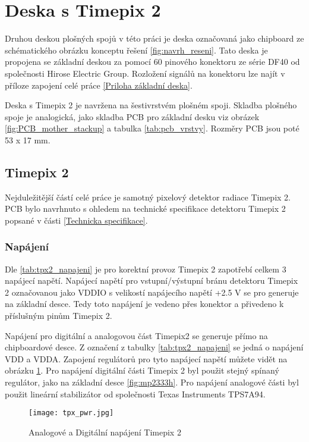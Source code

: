 \section{Deska s Timepix 2}
	Druhou deskou plošných spojů v této práci je deska označovaná jako chipboard ze schématického obrázku konceptu řešení \ref{fig:navrh_reseni}. Tato deska je propojena se základní deskou za pomocí 60 pinového konektoru ze série DF40 od společnosti Hirose Electric Group. Rozložení signálů na konektoru lze najít v příloze zapojení celé práce \ref{Priloha základní deska}.
	
	\par Deska s Timepix 2 je navržena na šestivrstvém plošném spoji. Skladba plošného spoje je analogická, jako skladba PCB pro základní desku viz obrázek \ref{fig:PCB_mother_stackup} a tabulka \ref{tab:pcb_vrstvy}. Rozměry PCB jsou poté 53 x 17 mm. 
\subsection{Timepix 2}	%
	Nejduležitější částí celé práce je samotný pixelový detektor radiace Timepix 2. PCB bylo navrhnuto s ohledem na technické specifikace detektoru Timepix 2 popsané v části \ref{Technicka specifikace}.
	\subsubsection{Napájení}	%
	Dle \ref{tab:tpx2_napajeni} je pro korektní provoz Timepix 2 zapotřebí celkem 3 napájecí napětí. Napájecí napětí pro vstupní/výstupní bránu detektoru Timepix 2 označovanou jako VDDIO s velikostí napájecího napětí +2.5 V se pro generuje na základní desce. Tedy toto napájení je vedeno přes konektor a přivedeno k příslušným pinům Timepix 2.
	\par Napájení pro digitální a analogovou část Timepix2 se generuje přímo na chipboardové desce. Z označení z tabulky \ref{tab:tpx2_napajeni} se jedná o napájení VDD a VDDA. Zapojení regulátorů pro tyto napájecí napětí můžete vidět na obrázku \ref{fig:tpx_pwr}. Pro napájení digitální části Timepix 2 byl použit stejný spínaný regulátor, jako na základní desce \ref{fig:mp2333h}. Pro napájení analogové části byl použit lineární stabilizátor od společnosti Texas Instruments TPS7A94.  
	
	\begin{figure}[h!]
		\centering
		\captionsetup{justification=centering}
		\texttt{[image: tpx\_pwr.jpg]}
		\caption{Analogové a Digitální napájení Timepix 2} 
		\label{fig:tpx_pwr}
	\end{figure} 
	
